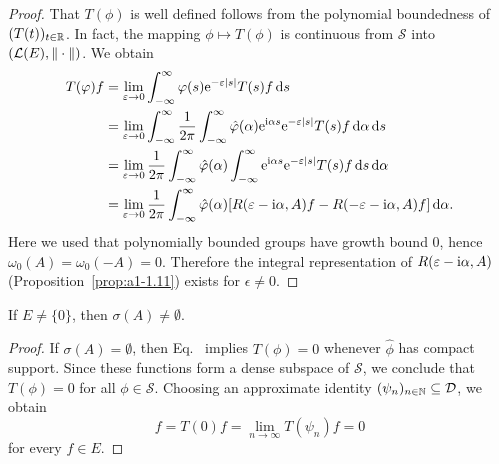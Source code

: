 \begin{proof}
That $T(\phi)$ is well defined follows from the polynomial boundedness of\/ $(T(t))_{t\in\mathbb{R}}$.
In fact, the mapping $\phi \mapsto T(\phi)$ is continuous from $\mathcal{S}$ into $(\mathcal{L}(E),\|\cdot\|)$.
We obtain
\begin{align*}
	T(\phi)f &= \lim_{\epsilon\to 0} \int_{-\infty}^{\infty} \phi(s)\eu^{-\epsilon|s|}T(s)f \ds \\
	&= \lim_{\epsilon\to 0} \int_{-\infty}^{\infty} \frac{1}{2\pi}\int_{-\infty}^{\infty} \hat{\phi}(\alpha)\eu^{\im\alpha s}\eu^{-\epsilon|s|}T(s)f \diff{\alpha} \ds \\
	&= \lim_{\epsilon\to 0} \frac{1}{2\pi}\int_{-\infty}^{\infty} \hat{\phi}(\alpha)\int_{-\infty}^{\infty} \eu^{\im\alpha s}\eu^{-\epsilon|s|}T(s)f \ds \diff{\alpha}\\
	&= \lim_{\epsilon\to 0} \frac{1}{2\pi}\int_{-\infty}^{\infty} \hat{\phi}(\alpha)[R(\epsilon-\im\alpha,A)f - R(-\epsilon-\im\alpha,A)f] \diff{\alpha}  .
\end{align*}
Here we used that polynomially bounded groups have growth bound $0$, hence $\omega_{0}(A) = \omega_{0}(-A) = 0$.
Therefore the integral representation of\/ $R(\epsilon-\im\alpha,A)$ (\cf Proposition~\ref{prop:a1-1.11}) exists for $\epsilon \neq 0$.
\end{proof}
\begin{lemma}\label{lem:a3-7.6}
If\/ $E \neq \{0\}$, then $\sigma(A) \neq \emptyset$.
\end{lemma}
\begin{proof}
If\/ $\sigma(A) = \emptyset$, then Eq.~ implies $T(\phi) = 0$ whenever $\hat{\phi}$ has compact support.
Since these functions form a dense subspace of\/ $\mathcal{S}$, we conclude that $T(\phi) = 0$ for all $\phi \in \mathcal{S}$.
Choosing an approximate identity $(\psi_{n})_{n\in\mathbb{N}} \subseteq \mathcal{D}$, we obtain
\[
f = T(0)f = \lim_{n\to\infty} T(\psi_{n})f = 0
\]
for every $f \in E$.
\end{proof}
